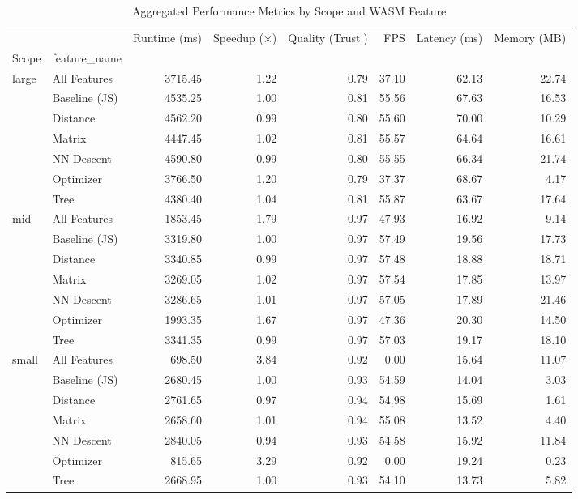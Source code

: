 \begin{table}
\caption{Aggregated Performance Metrics by Scope and WASM Feature}
\label{tab:aggregated_comparison}
\begin{tabular}{llrrrrrr}
\toprule
 &  & Runtime (ms) & Speedup (×) & Quality (Trust.) & FPS & Latency (ms) & Memory (MB) \\
Scope & feature_name &  &  &  &  &  &  \\
\midrule
\multirow[t]{7}{*}{large} & All Features & 3715.45 & 1.22 & 0.79 & 37.10 & 62.13 & 22.74 \\
 & Baseline (JS) & 4535.25 & 1.00 & 0.81 & 55.56 & 67.63 & 16.53 \\
 & Distance & 4562.20 & 0.99 & 0.80 & 55.60 & 70.00 & 10.29 \\
 & Matrix & 4447.45 & 1.02 & 0.81 & 55.57 & 64.64 & 16.61 \\
 & NN Descent & 4590.80 & 0.99 & 0.80 & 55.55 & 66.34 & 21.74 \\
 & Optimizer & 3766.50 & 1.20 & 0.79 & 37.37 & 68.67 & 4.17 \\
 & Tree & 4380.40 & 1.04 & 0.81 & 55.87 & 63.67 & 17.64 \\
\cline{1-8}
\multirow[t]{7}{*}{mid} & All Features & 1853.45 & 1.79 & 0.97 & 47.93 & 16.92 & 9.14 \\
 & Baseline (JS) & 3319.80 & 1.00 & 0.97 & 57.49 & 19.56 & 17.73 \\
 & Distance & 3340.85 & 0.99 & 0.97 & 57.48 & 18.88 & 18.71 \\
 & Matrix & 3269.05 & 1.02 & 0.97 & 57.54 & 17.85 & 13.97 \\
 & NN Descent & 3286.65 & 1.01 & 0.97 & 57.05 & 17.89 & 21.46 \\
 & Optimizer & 1993.35 & 1.67 & 0.97 & 47.36 & 20.30 & 14.50 \\
 & Tree & 3341.35 & 0.99 & 0.97 & 57.03 & 19.17 & 18.10 \\
\cline{1-8}
\multirow[t]{7}{*}{small} & All Features & 698.50 & 3.84 & 0.92 & 0.00 & 15.64 & 11.07 \\
 & Baseline (JS) & 2680.45 & 1.00 & 0.93 & 54.59 & 14.04 & 3.03 \\
 & Distance & 2761.65 & 0.97 & 0.94 & 54.98 & 15.69 & 1.61 \\
 & Matrix & 2658.60 & 1.01 & 0.94 & 55.08 & 13.52 & 4.40 \\
 & NN Descent & 2840.05 & 0.94 & 0.93 & 54.58 & 15.92 & 11.84 \\
 & Optimizer & 815.65 & 3.29 & 0.92 & 0.00 & 19.24 & 0.23 \\
 & Tree & 2668.95 & 1.00 & 0.93 & 54.10 & 13.73 & 5.82 \\
\cline{1-8}
\bottomrule
\end{tabular}
\end{table}
